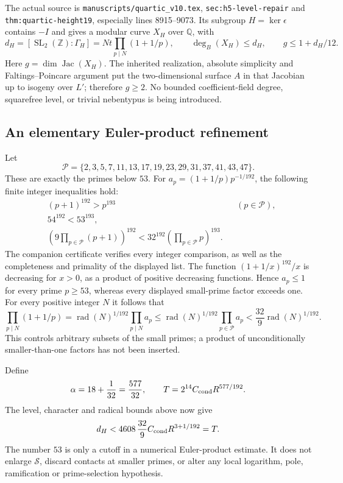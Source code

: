 The actual source is
\texttt{manuscripts/quartic\_v10.tex},
\texttt{sec:h5-level-repair} and \texttt{thm:quartic-height19},
especially lines 8915--9073. Its subgroup $H=\ker\epsilon$ contains
$-I$ and gives a modular curve $X_H$ over $\mathbb Q$, with
\[
 d_H=[\operatorname{SL}_2(\mathbb Z):\Gamma_H]
     =Nt\prod_{p\mid N}(1+1/p),\qquad
 \deg_B(X_H)\le d_H,\qquad g\le1+d_H/12.
\]
Here $g=\dim\operatorname{Jac}(X_H)$. The inherited realization,
absolute simplicity and Faltings--Poincare argument put the
two-dimensional surface $A$ in that Jacobian up to isogeny over $L'$;
therefore $g\ge2$. No bounded coefficient-field degree, squarefree level,
or trivial nebentypus is being introduced.

\subsection{An elementary Euler-product refinement}

Let
\[
 \mathcal P=\{2,3,5,7,11,13,17,19,23,29,31,37,41,43,47\}.
\]
These are exactly the primes below $53$. For
$a_p=(1+1/p)p^{-1/192}$, the following finite integer inequalities hold:
\begin{align*}
 &(p+1)^{192}>p^{193} &&(p\in\mathcal P),\\
 &54^{192}<53^{193},\\
 &\left(9\prod_{p\in\mathcal P}(p+1)\right)^{192}
       <32^{192}\left(\prod_{p\in\mathcal P}p\right)^{193}.
\end{align*}
The companion certificate verifies every integer comparison, as well as
the completeness and primality of the displayed list. The function
$(1+1/x)^{192}/x$ is decreasing for $x>0$, as a product of positive
decreasing functions. Hence $a_p\le1$ for every prime $p\ge53$,
whereas every displayed small-prime factor exceeds one. For every
positive integer $N$ it follows that
\[
 \prod_{p\mid N}(1+1/p)
 =\operatorname{rad}(N)^{1/192}\prod_{p\mid N}a_p
 \le\operatorname{rad}(N)^{1/192}\prod_{p\in\mathcal P}a_p
 <\frac{32}{9}\operatorname{rad}(N)^{1/192}.
\]
This controls arbitrary subsets of the small primes; a product of
unconditionally smaller-than-one factors has not been inserted.

Define
\[
 \alpha=18+\frac1{32}=\frac{577}{32},\qquad
 T=2^{14}C_{\rm cond}R^{577/192}.
\]
The level, character and radical bounds above now give
\[
 d_H<4608\,\frac{32}{9}C_{\rm cond}R^{3+1/192}=T.
\]
The number $53$ is only a cutoff in a numerical Euler-product estimate.
It does not enlarge $\mathcal S$, discard contacts at smaller primes,
or alter any local logarithm, pole, ramification or prime-selection
hypothesis.


